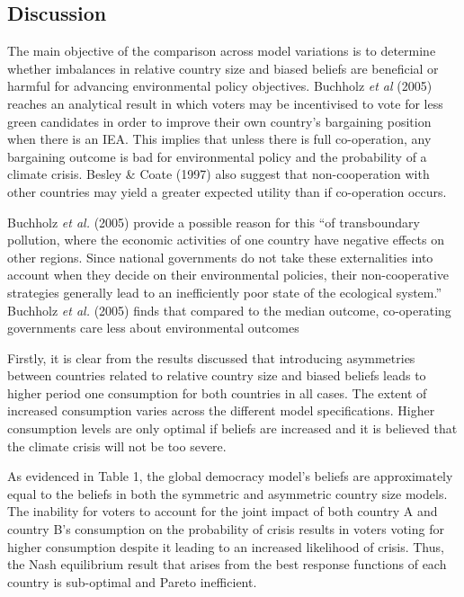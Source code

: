 \documentclass[11pt,preprint, authoryear]{elsarticle}
\numberwithin{equation}{section}
\numberwithin{figure}{section}
\numberwithin{table}{section}
\begin{document}
\hypertarget{discussion}{%
\subsection{Discussion}\label{discussion}}

The main objective of the comparison across model variations is to
determine whether imbalances in relative country size and biased beliefs
are beneficial or harmful for advancing environmental policy objectives.
Buchholz \emph{et al} (2005) reaches an analytical result in which
voters may be incentivised to vote for less green candidates in order to
improve their own country's bargaining position when there is an IEA.
This implies that unless there is full co-operation, any bargaining
outcome is bad for environmental policy and the probability of a climate
crisis. Besley \& Coate (1997) also suggest that non-cooperation with
other countries may yield a greater expected utility than if
co-operation occurs.

Buchholz \emph{et al.} (2005) provide a possible reason for this ``of
transboundary pollution, where the economic activities of one country
have negative effects on other regions. Since national governments do
not take these externalities into account when they decide on their
environmental policies, their non-cooperative strategies generally lead
to an inefficiently poor state of the ecological system.'' Buchholz
\emph{et al.} (2005) finds that compared to the median outcome,
co-operating governments care less about environmental outcomes

Firstly, it is clear from the results discussed that introducing
asymmetries between countries related to relative country size and
biased beliefs leads to higher period one consumption for both countries
in all cases. The extent of increased consumption varies across the
different model specifications. Higher consumption levels are only
optimal if beliefs are increased and it is believed that the climate
crisis will not be too severe.

As evidenced in Table 1, the global democracy model's beliefs are
approximately equal to the beliefs in both the symmetric and asymmetric
country size models. The inability for voters to account for the joint
impact of both country A and country B's consumption on the probability
of crisis results in voters voting for higher consumption despite it
leading to an increased likelihood of crisis. Thus, the Nash equilibrium
result that arises from the best response functions of each country is
sub-optimal and Pareto inefficient.
\end{document}
